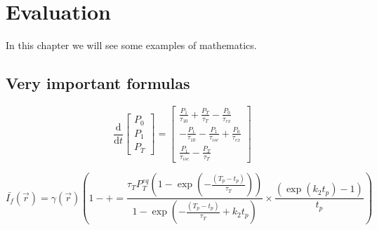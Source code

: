 \chapter{Evaluation}
In this chapter we will see some examples of mathematics.

\lipsum[1]

\section{Very important formulas}
\lipsum[2]

\begin{equation}\label{eqn:rate_eqns}
\frac{\textrm{d}}{\textrm{d}t}
\left[
\begin{array}{l}
P_{\textit{0}} \\
P_{\textit{1}} \\
P_{\textit{T}}
\end{array}
\right] =
\left[
\begin{array}{l}
\frac{P_{\textit{1}}}{\tau_{\textit{10}}} + \frac{P_{\textit{T}}}{\tau_{\textit{T}}} - \frac{P_{\textit{0}}}{\tau_{\textit{ex}}} \\
- \frac{P_{\textit{1}}}{\tau_{\textit{10}}} - \frac{P_{\textit{1}}}{\tau_{isc}} + \frac{P_{\textit{0}}}{\tau_{\textit{ex}}} \\
\frac{P_{\textit{1}}}{\tau_{isc}} -  \frac{P_{\textit{T}}}{\tau_{\textit{T}}}
\end{array}
\right]
\end{equation}

\lipsum[3]


\begin{equation}\label{eqn:avgfluorescence}
\bar{I_{f}}(\vec{r})	 
	= \gamma(\vec{r}) \left(1 - + = \frac{\tau_{\textit{T}} P_{\textit{T}}^{{eq}}\left(1-\exp \left(-\frac{(T_p - t_p)}{\tau_{\textit{T}}}\right)\right)}{1-\exp\left(-\frac{(T_p - t_p)}{\tau_{\textit{T}}} + k_{\textit{2}} t_p\right)} \times \frac{\left(\exp\left(k_{\textit{2}} t_p\right)-1\right)}{t_p} \right) 
\end{equation}

\lipsum[3]
